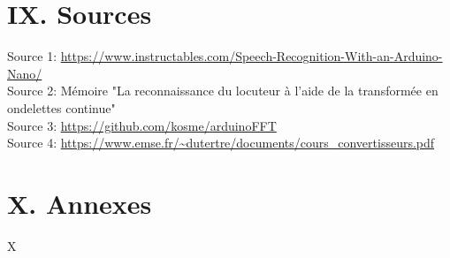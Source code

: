 \documentclass[a4paper,11pt]{book}
\begin{document}
\newpage
\section*{IX. Sources}

Source 1: \url{https://www.instructables.com/Speech-Recognition-With-an-Arduino-Nano/} \\

\noindent Source 2: Mémoire "La reconnaissance du locuteur à l'aide de la transformée en ondelettes continue" \\

\noindent Source 3: \url{https://github.com/kosme/arduinoFFT} \\

\noindent Source 4: \url{https://www.emse.fr/~dutertre/documents/cours_convertisseurs.pdf}


\section*{X. Annexes}
X
\end{document}
